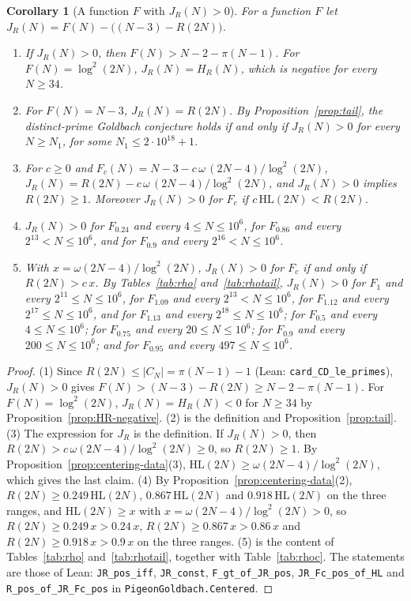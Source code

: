 \documentclass[11pt]{amsart}
\newtheorem{Corollary}[Theorem]{Corollary}
\theoremstyle{definition}
\theoremstyle{remark}
\begin{document}
\begin{Corollary}[A function $F$ with $J_R(N)>0$]\label{cor:JR}
For a function $F$ let $J_R(N)=F(N)-\bigl((N-3)-R(2N)\bigr)$.
\begin{enumerate}
\item[\emph{(1)}] If $J_R(N)>0$, then $F(N)>N-2-\pi(N-1)$. For $F(N)=\log^2(2N)$, $J_R(N)=H_R(N)$, which is negative for every $N\geq 34$.
\item[\emph{(2)}] For $F(N)=N-3$, $J_R(N)=R(2N)$. By Proposition~\ref{prop:tail}, the distinct-prime Goldbach conjecture holds if and only if $J_R(N)>0$ for every $N\geq N_1$, for some $N_1\leq 2\cdot 10^{18}+1$.
\item[\emph{(3)}] For $c\geq 0$ and $F_c(N)=N-3-c\,\omega\,(2N-4)/\log^2(2N)$, $J_R(N)=R(2N)-c\,\omega\,(2N-4)/\log^2(2N)$, and $J_R(N)>0$ implies $R(2N)\geq 1$. Moreover $J_R(N)>0$ for $F_c$ if $c\,\mathrm{HL}(2N)<R(2N)$.
\item[\emph{(4)}] $J_R(N)>0$ for $F_{0.24}$ and every $4\leq N\leq 10^6$, for $F_{0.86}$ and every $2^{13}<N\leq 10^6$, and for $F_{0.9}$ and every $2^{16}<N\leq 10^6$.
\item[\emph{(5)}] With $x=\omega(2N-4)/\log^2(2N)$, $J_R(N)>0$ for $F_c$ if and only if $R(2N)>c\,x$. By Tables~\ref{tab:rho} and~\ref{tab:rhotail}, $J_R(N)>0$ for $F_{1}$ and every $2^{11}\leq N\leq 10^6$, for $F_{1.09}$ and every $2^{13}<N\leq 10^6$, for $F_{1.12}$ and every $2^{17}\leq N\leq 10^6$, and for $F_{1.13}$ and every $2^{18}\leq N\leq 10^6$; for $F_{0.5}$ and every $4\leq N\leq 10^6$; for $F_{0.75}$ and every $20\leq N\leq 10^6$; for $F_{0.9}$ and every $200\leq N\leq 10^6$; and for $F_{0.95}$ and every $497\leq N\leq 10^6$.
\end{enumerate}
\end{Corollary}
\begin{proof}
(1) Since $R(2N)\leq|C_N|=\pi(N-1)-1$ (Lean: \texttt{card\_CD\_le\_primes}), $J_R(N)>0$ gives $F(N)>(N-3)-R(2N)\geq N-2-\pi(N-1)$. For $F(N)=\log^2(2N)$, $J_R(N)=H_R(N)<0$ for $N\geq 34$ by Proposition~\ref{prop:HR-negative}. (2) is the definition and Proposition~\ref{prop:tail}. (3) The expression for $J_R$ is the definition. If $J_R(N)>0$, then $R(2N)>c\,\omega(2N-4)/\log^2(2N)\geq 0$, so $R(2N)\geq 1$. By Proposition~\ref{prop:centering-data}(3), $\mathrm{HL}(2N)\geq\omega(2N-4)/\log^2(2N)$, which gives the last claim. (4) By Proposition~\ref{prop:centering-data}(2), $R(2N)\geq 0.249\,\mathrm{HL}(2N)$, $0.867\,\mathrm{HL}(2N)$ and $0.918\,\mathrm{HL}(2N)$ on the three ranges, and $\mathrm{HL}(2N)\geq x$ with $x=\omega(2N-4)/\log^2(2N)>0$, so $R(2N)\geq 0.249\,x>0.24\,x$, $R(2N)\geq 0.867\,x>0.86\,x$ and $R(2N)\geq 0.918\,x>0.9\,x$ on the three ranges. (5) is the content of Tables~\ref{tab:rho} and~\ref{tab:rhotail}, together with Table~\ref{tab:rhoc}. The statements are those of Lean: \texttt{JR\_pos\_iff}, \texttt{JR\_const}, \texttt{F\_gt\_of\_JR\_pos}, \texttt{JR\_Fc\_pos\_of\_HL} and \texttt{R\_pos\_of\_JR\_Fc\_pos} in \texttt{PigeonGoldbach.Centered}.
\end{proof}
\end{document}
